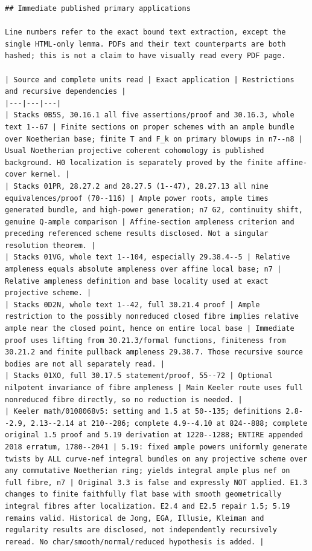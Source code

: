\documentclass[11pt]{article}
\begin{document}
\begin{Verbatim}[breaklines=true,fontsize=\footnotesize]
## Immediate published primary applications

Line numbers refer to the exact bound text extraction, except the single HTML-only lemma. PDFs and their text counterparts are both hashed; this is not a claim to have visually read every PDF page.

| Source and complete units read | Exact application | Restrictions and recursive dependencies |
|---|---|---|
| Stacks 0B5S, 30.16.1 all five assertions/proof and 30.16.3, whole text 1--67 | Finite sections on proper schemes with an ample bundle over Noetherian base; finite T and F_k on primary blowups in n7--n8 | Usual Noetherian projective coherent cohomology is published background. H0 localization is separately proved by the finite affine-cover kernel. |
| Stacks 01PR, 28.27.2 and 28.27.5 (1--47), 28.27.13 all nine equivalences/proof (70--116) | Ample power roots, ample times generated bundle, and high-power generation; n7 G2, continuity shift, genuine Q-ample comparison | Affine-section ampleness criterion and preceding referenced scheme results disclosed. Not a singular resolution theorem. |
| Stacks 01VG, whole text 1--104, especially 29.38.4--5 | Relative ampleness equals absolute ampleness over affine local base; n7 | Relative ampleness definition and base locality used at exact projective scheme. |
| Stacks 0D2N, whole text 1--42, full 30.21.4 proof | Ample restriction to the possibly nonreduced closed fibre implies relative ample near the closed point, hence on entire local base | Immediate proof uses lifting from 30.21.3/formal functions, finiteness from 30.21.2 and finite pullback ampleness 29.38.7. Those recursive source bodies are not all separately read. |
| Stacks 01XO, full 30.17.5 statement/proof, 55--72 | Optional nilpotent invariance of fibre ampleness | Main Keeler route uses full nonreduced fibre directly, so no reduction is needed. |
| Keeler math/0108068v5: setting and 1.5 at 50--135; definitions 2.8--2.9, 2.13--2.14 at 210--286; complete 4.9--4.10 at 824--888; complete original 1.5 proof and 5.19 derivation at 1220--1288; ENTIRE appended 2018 erratum, 1780--2041 | 5.19: fixed ample powers uniformly generate twists by ALL curve-nef integral bundles on any projective scheme over any commutative Noetherian ring; yields integral ample plus nef on full fibre, n7 | Original 3.3 is false and expressly NOT applied. E1.3 changes to finite faithfully flat base with smooth geometrically integral fibres after localization. E2.4 and E2.5 repair 1.5; 5.19 remains valid. Historical de Jong, EGA, Illusie, Kleiman and regularity results are disclosed, not independently recursively reread. No char/smooth/normal/reduced hypothesis is added. |

\end{Verbatim}
\end{document}
